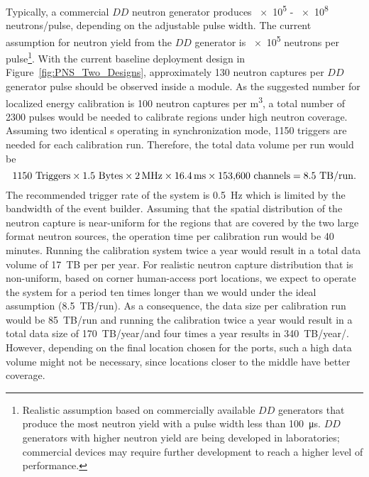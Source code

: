 Typically, a commercial $DD$ neutron generator produces \num{e5} - \num{e8} neutrons/pulse, depending on the adjustable pulse width. The current assumption for neutron yield from the $DD$ generator is \num{e5} neutrons per pulse\footnote{Realistic assumption based on commercially available $DD$ generators that produce the most neutron yield with a pulse width less than \SI{100}{\micro\s}. 
$DD$ generators with higher neutron yield are being developed in laboratories; commercial devices may require further development to reach a higher level of performance.}. 
With the current baseline deployment design in 
Figure~\ref{fig:PNS_Two_Designs}, approximately \num{130} neutron captures per $DD$ generator pulse should be observed inside a \nominalmodsize module. 
As the suggested number for localized energy calibration is \num{100} neutron captures per \si{\cubic\m}, a total number of \num{2300} pulses would be needed to calibrate regions under high neutron coverage. Assuming two identical s operating in synchronization mode, \num{1150} triggers are needed for each calibration run. Therefore, the total data volume per run would be
\begin{equation}
\num{1150}~{\rm Triggers} \times \num{1.5}~{\rm Bytes}\times
\SI{2}{\mega\hertz}\times \SI{16.4}{\milli\s}\times \dpnumcrpch~{\rm channels} = \num{8.5}~{\rm TB/run}.
\end{equation}
The recommended trigger rate of the  system is \SI{0.5}{\hertz} which is limited by the bandwidth of the  event builder.  Assuming that the spatial distribution of the neutron capture is near-uniform for the regions that are covered by the two large format neutron sources, the operation time per calibration run would be 40 minutes.   
Running the  calibration system twice a year would result in a total data volume of \SI{17}{TB} per \nominalmodsize per year. 
For realistic neutron capture distribution that is non-uniform, based on corner human-access port locations, we expect to operate the  system for a period ten times longer than we would under the ideal assumption (\SI{8.5}{TB/run}). As a consequence, the data size per calibration run would be \SI{85}{TB/run} and running the  calibration twice a year would result in a total data size of \num{170}~TB/year/\nominalmodsize and four times a year results in \num{340}~TB/year/\nominalmodsize. However, depending on the final location chosen for the  ports, such a high data volume might not be necessary, since locations closer to the middle have better coverage.



